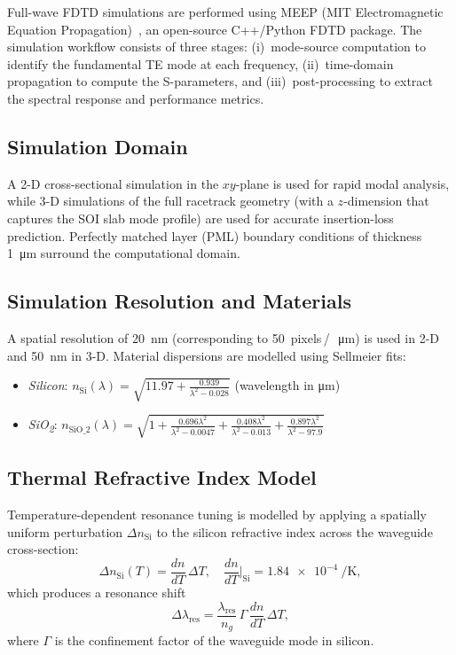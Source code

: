 Full-wave FDTD simulations are performed using MEEP
(MIT Electromagnetic Equation Propagation)~\cite{oskooi2010meep}, an
open-source C++/Python FDTD package.  The simulation workflow consists
of three stages: (i)~mode-source computation to identify the fundamental
TE mode at each frequency, (ii)~time-domain propagation to compute the
S-parameters, and (iii)~post-processing to extract the spectral response
and performance metrics.

\subsection{Simulation Domain}
A 2-D cross-sectional simulation in the $xy$-plane is used for rapid
modal analysis, while 3-D simulations of the full racetrack geometry
(with a $z$-dimension that captures the SOI slab mode profile) are used
for accurate insertion-loss prediction.  Perfectly matched layer (PML)
boundary conditions of thickness \SI{1}{\micro\meter} surround the
computational domain.

\subsection{Simulation Resolution and Materials}
A spatial resolution of \SI{20}{\nano\meter} (corresponding to
50~pixels\,/\,\SI{}{\micro\meter}) is used in 2-D and \SI{50}{\nano\meter}
in 3-D.  Material dispersions are modelled using Sellmeier fits:
\begin{itemize}
  \item \emph{Silicon}:
        $n_\text{Si}(\lambda) = \sqrt{11.97 +
        \tfrac{0.939}{\lambda^2 - 0.028}}$ (wavelength in \si{\micro\meter})
  \item \emph{SiO\textsubscript{2}}:
        $n_\text{SiO_2}(\lambda) = \sqrt{1 +
        \tfrac{0.696\lambda^2}{\lambda^2-0.0047} +
        \tfrac{0.408\lambda^2}{\lambda^2-0.013} +
        \tfrac{0.897\lambda^2}{\lambda^2-97.9}}$
\end{itemize}

\subsection{Thermal Refractive Index Model}
Temperature-dependent resonance tuning is modelled by applying a
spatially uniform perturbation $\Delta n_\text{Si}$ to the silicon
refractive index across the waveguide cross-section:
\begin{equation}
  \Delta n_\text{Si}(T) = \frac{dn}{dT}\,\Delta T,
  \quad \frac{dn}{dT}\bigg|_\text{Si} = \SI{1.84e-4}{\per\kelvin},
  \label{eq:thermo_optic}
\end{equation}
which produces a resonance shift
\begin{equation}
  \Delta\lambda_\text{res} = \frac{\lambda_\text{res}}{n_g}\,
  \Gamma\,\frac{dn}{dT}\,\Delta T,
  \label{eq:resonance_shift}
\end{equation}
where $\Gamma$ is the confinement factor of the waveguide mode in silicon.


